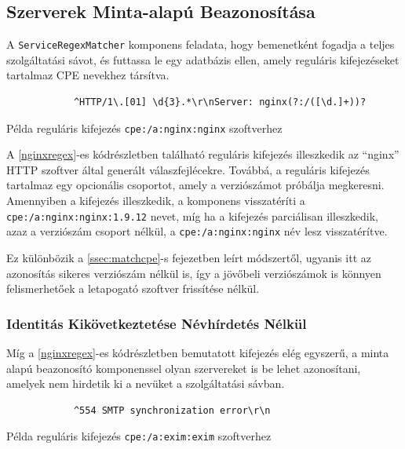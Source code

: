 \documentclass[a4paper,12pt]{article}
\begin{document}
\subsection{Szerverek Minta-alapú Beazonosítása} \label{ssec:patternmatch}

	A \texttt{ServiceRegexMatcher} komponens feladata, hogy bemenetként fogadja a teljes szolgáltatási sávot, és futtassa le egy adatbázis ellen, amely reguláris kifejezéseket tartalmaz CPE nevekhez társítva.

	\begin{listing}[H]
		\begin{verbatim}
			^HTTP/1\.[01] \d{3}.*\r\nServer: nginx(?:/([\d.]+))?
		\end{verbatim}
		\caption{Példa reguláris kifejezés \texttt{cpe:/a:nginx:nginx} szoftverhez}
		\label{nginxregex}
	\end{listing}
	
	A \ref{nginxregex}-es kódrészletben található reguláris kifejezés illeszkedik az ``nginx'' HTTP szoftver által generált válaszfejlécekre. Továbbá, a reguláris kifejezés tartalmaz egy opcionális csoportot, amely a verziószámot próbálja megkeresni. Amennyiben a kifejezés illeszkedik, a komponens visszatéríti a \texttt{cpe:/a:nginx:nginx:1.9.12} nevet, míg ha a kifejezés parciálisan illeszkedik, azaz a verziószám csoport nélkül, a \texttt{cpe:/a:nginx:nginx} név lesz visszatérítve.
	
	Ez különbözik a \ref{ssec:matchcpe}-s fejezetben leírt módszertől, ugyanis itt az azonosítás sikeres verziószám nélkül is, így a jövőbeli verziószámok is könnyen felismerhetőek a letapogató szoftver frissítése nélkül.
	
\subsubsection{Identitás Kikövetkeztetése Névhírdetés Nélkül}
	
	Míg a \ref{nginxregex}-es kódrészletben bemutatott kifejezés elég egyszerű, a minta alapú beazonosító komponenssel olyan szervereket is be lehet azonosítani, amelyek nem hirdetik ki a nevüket a szolgáltatási sávban.
	
	\begin{listing}[H]
		\begin{verbatim}
			^554 SMTP synchronization error\r\n
		\end{verbatim}
		\caption{Példa reguláris kifejezés \texttt{cpe:/a:exim:exim} szoftverhez}
		\label{eximregex}
	\end{listing}
	
\end{document}
